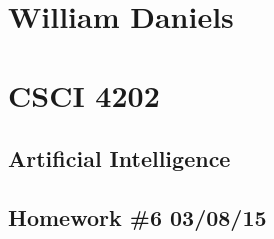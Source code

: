 \documentclass[11pt]{article}
\begin{document}
\begin{center}
\section*{William Daniels}
\section*{CSCI 4202}
\subsection*{Artificial Intelligence}
\subsection*{Homework \#6 03/08/15}
\end{center}

\vspace{.25cm}
\end{document}
